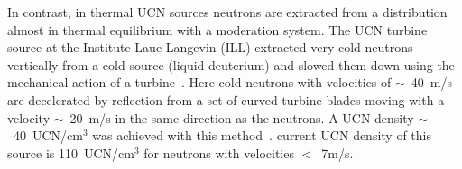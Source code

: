 In contrast, in thermal UCN sources neutrons are extracted from a
distribution almost in thermal equilibrium with a moderation system.
The UCN turbine source at the Institute Laue-Langevin (ILL) extracted
very cold neutrons vertically from a cold source (liquid deuterium)
and slowed them down using the mechanical action of a
turbine~\cite{Steyerl1986,Steyerl1975}. Here cold neutrons
with velocities of $\sim$~40~m/s are decelerated by reflection from a
set of curved turbine blades moving with a velocity $\sim$~20~m/s in
the same direction as the neutrons. A UCN density $\sim$~40~UCN/cm$^3$
was achieved with this method~\cite{ucnbook,Albert_talk}. %
current UCN density of this source is 110~UCN/cm$^3$ for neutrons with
velocities $<$~7m/s\cite{Steyerl1986}.






